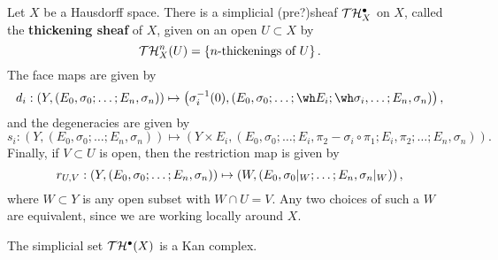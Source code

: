 Let $X$ be a Hausdorff space. There is a simplicial (pre?)sheaf $\mathcal T \mathcal H_X^\bullet$ on $X$, called the {\bf thickening sheaf} of $X$, given on an open $U \subset X$ by
\[ \mathcal T \mathcal H_X^n(U) = \left\{ \text{$n$-thickenings of $U$} \right\}. \]
The face maps are given by
\[ d_i : \left( Y, (E_0, \sigma_0; \dots; E_n, \sigma_n) \right) \mapsto \left( \sigma_i^{-1}(0), (E_0, \sigma_0; \dots; \wh E_i; \wh \sigma_i, \dots ; E_n, \sigma_n) \right), \]
and the degeneracies are given by
\[ s_i : \left( Y, (E_0, \sigma_0; \dots; E_n, \sigma_n) \right) \mapsto \left( Y \times E_i, (E_0, \sigma_0; \dots; E_i, \pi_2 - \sigma_i \circ \pi_1; E_i, \pi_2; \dots; E_n, \sigma_n) \right). \]
Finally, if $V \subset U$ is open, then the restriction map is given by
\[ r_{U, V}: \left( Y, (E_0, \sigma_0; \dots; E_n, \sigma_n) \right) \mapsto \left( W, (E_0, {\sigma_0|_{W}}; \dots; E_n, {\sigma_n|_{W}}) \right), \]
where $W \subset Y$ is any open subset with $W \cap U = V$. Any two choices of such a $W$ are equivalent, since we are working locally around $X$.

\begin{prop}\label{thickenings-are-kan-complexes}
The simplicial set $\mathcal T \mathcal H^\bullet(X)$ is a Kan complex.
\end{prop}

